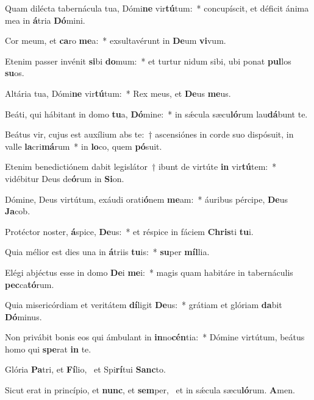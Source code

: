 \item Quam dilécta tabernácula tua, Dómi\textbf{ne} vir\textbf{tú}tum:~* concupíscit, et déficit ánima mea in \textbf{á}tria \textbf{Dó}mini.
\item Cor meum, et \textbf{ca}ro \textbf{me}a:~* exsultavérunt in \textbf{De}um \textbf{vi}vum.
\item Etenim passer invénit \textbf{si}bi \textbf{do}mum:~* et turtur nidum sibi, ubi ponat \textbf{pul}los \textbf{su}os.
\item Altária tua, Dómi\textbf{ne} vir\textbf{tú}\-tum:~* Rex meus, et \textbf{De}us \textbf{me}us.
\item Beáti, qui hábitant in domo \textbf{tu}a, \textbf{Dó}mine:~* in sǽcula sæcu\textbf{ló}rum lau\textbf{dá}bunt te.
\item Beátus vir, cujus est auxílium abs te:~† ascensiónes in corde suo dispósuit, in valle \textbf{la}cri\textbf{má}rum~* in \textbf{lo}co, quem \textbf{pó}suit.
\item Etenim benedictiónem dabit legislátor~† ibunt de virtúte \textbf{in} vir\textbf{tú}tem:~* vidébitur Deus de\textbf{ó}rum in \textbf{Si}on.
\item Dómine, Deus virtútum, exáudi orati\textbf{ó}nem \textbf{me}am:~* áuribus pércipe, \textbf{De}us \textbf{Ja}cob.
\item Protéctor noster, \textbf{á}spice, \textbf{De}us:~* et réspice in fáciem \textbf{Chris}ti \textbf{tu}i.
\item Quia mélior est dies una in \textbf{á}triis \textbf{tu}is:~* \textbf{su}per \textbf{míl}lia.
\item Elégi abjéctus esse in domo \textbf{De}i \textbf{me}i:~* magis quam habitáre in tabernáculis \textbf{pec}ca\textbf{tó}rum.
\item Quia misericórdiam et veritátem \textbf{dí}ligit \textbf{De}us:~* grátiam et glóriam \textbf{da}bit \textbf{Dó}minus.
\item Non privábit bonis eos qui ámbulant in \textbf{in}no\textbf{cén}tia:~* Dómine virtútum, beátus homo qui \textbf{spe}rat \textbf{in} te.
\item Glória \textbf{Pa}tri, et \textbf{Fí}lio,~\psstar{} et Spi\textbf{rí}tui \textbf{Sanc}to.
\item Sicut erat in princípio, et \textbf{nunc}, et \textbf{sem}per,~\psstar{} et in sǽcula sæcu\textbf{ló}rum. \textbf{A}men.
